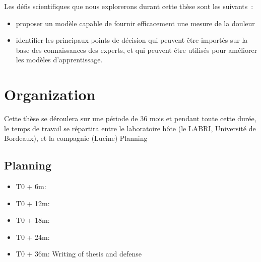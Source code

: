 \documentclass[11pt]{article}
\begin{document}
Les défis scientifiques que nous explorerons durant cette thèse sont les suivants~:
\begin{itemize}
\item proposer un modèle capable de fournir efficacement une mesure de la douleur
\item identifier les principaux points de décision qui peuvent être importés sur
la base des connaissances des experts, et qui peuvent être utilisés pour
améliorer les modèles d’apprentissage.
\end{itemize}

\section{Organization}
\label{sec:org1cc9eab}
Cette thèse se déroulera sur une période de 36 mois et pendant toute cette
durée, le temps de travail se répartira entre le laboratoire hôte (le LABRI,
Université de Bordeaux), et la compagnie (Lucine) Planning
\subsection{Planning}
\label{sec:org8a30be3}
\begin{itemize}
\item T0 + 6m:
\item T0 + 12m:
\item T0 + 18m:
\item T0 + 24m:
\item T0 + 36m: Writing of thesis and defense
\end{itemize}





\end{document}
